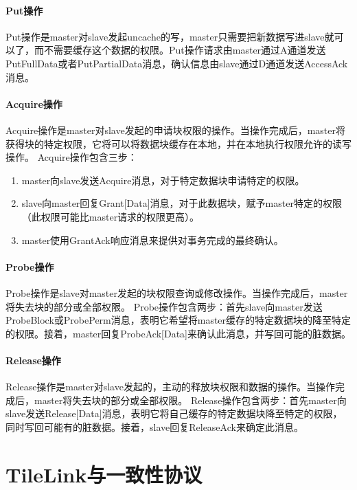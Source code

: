 \begin{center}
\paragraph{Put操作}
Put操作是master对slave发起uncache的写，master只需要把新数据写进slave就可以了，而不需要缓存这个数据的权限。Put操作请求由master通过A通道发送PutFullData或者PutPartialData消息，确认信息由slave通过D通道发送AccessAck消息。

\paragraph{Acquire操作}
Acquire操作是master对slave发起的申请块权限的操作。当操作完成后，master将获得块的特定权限，它将可以将数据块缓存在本地，并在本地执行权限允许的读写操作。
Acquire操作包含三步：
\begin{enumerate}
	\item master向slave发送Acquire消息，对于特定数据块申请特定的权限。
	\item slave向master回复Grant[Data]消息，对于此数据块，赋予master特定的权限（此权限可能比master请求的权限更高）。
	\item master使用GrantAck响应消息来提供对事务完成的最终确认。
\end{enumerate}

\paragraph{Probe操作}
Probe操作是slave对master发起的块权限查询或修改操作。当操作完成后，master将失去块的部分或全部权限。
Probe操作包含两步：首先slave向master发送ProbeBlock或ProbePerm消息，表明它希望将master缓存的特定数据块的降至特定的权限。接着，master回复ProbeAck[Data]来确认此消息，并写回可能的脏数据。

\paragraph{Release操作}
Release操作是master对slave发起的，主动的释放块权限和数据的操作。当操作完成后，master将失去块的部分或全部权限。
Release操作包含两步：首先master向slave发送Release[Data]消息，表明它将自己缓存的特定数据块降至特定的权限，同时写回可能有的脏数据。接着，slave回复ReleaseAck来确定此消息。

\section{TileLink与一致性协议}


\end{center}

